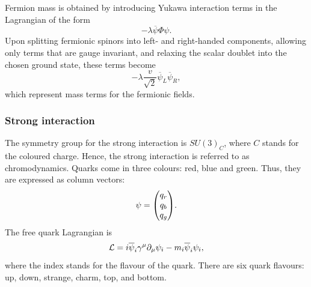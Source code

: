 Fermion mass is obtained by introducing Yukawa interaction terms in the Lagrangian of the form
\begin{equation}
    -\lambda \overline{\psi} \Phi \psi.
\end{equation}
Upon splitting fermionic spinors into left- and right-handed components, allowing only terms that are gauge invariant, and relaxing the scalar doublet into the chosen ground state, these terms become
\begin{equation}
    -\lambda\frac{v}{\sqrt{2}}\overline{\psi}_L\overline{\psi}_R,
\end{equation}
which represent mass terms for the fermionic fields.

\subsubsection*{Strong interaction}


The symmetry group for the strong interaction is $SU(3)_C$, where $C$ stands for the coloured charge. Hence, the strong interaction is referred to as chromodynamics. Quarks come in three colours: red, blue and green. Thus, they are expressed as column vectors:
$$\psi = \mqty( q_r \\ q_b \\ q_g).$$
The free quark Lagrangian is
\begin{equation}
    \mathcal{L} = i \overline{\psi}_i\gamma^\mu \partial_{\mu} \psi_i-m_i\overline{\psi}_i\psi_i,
\end{equation}
where the index stands for the flavour of the quark. There are six quark flavours: up, down, strange, charm, top, and bottom.

